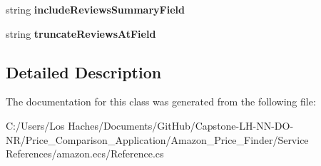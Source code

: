 \begin{DoxyCompactItemize}
\item 
\hypertarget{class_price___comparison_1_1amazon_1_1ecs_1_1_item_search_request_a0349f9c42f546fb07798253b7558176c}{string {\bfseries include\-Reviews\-Summary\-Field}}\label{class_price___comparison_1_1amazon_1_1ecs_1_1_item_search_request_a0349f9c42f546fb07798253b7558176c}

\item 
\hypertarget{class_price___comparison_1_1amazon_1_1ecs_1_1_item_search_request_a3098b8e26374ce2906429c21a3ea8f04}{string {\bfseries truncate\-Reviews\-At\-Field}}\label{class_price___comparison_1_1amazon_1_1ecs_1_1_item_search_request_a3098b8e26374ce2906429c21a3ea8f04}

\end{DoxyCompactItemize}


\subsection{Detailed Description}


The documentation for this class was generated from the following file\-:\begin{DoxyCompactItemize}
\item 
C\-:/\-Users/\-Los Haches/\-Documents/\-Git\-Hub/\-Capstone-\/\-L\-H-\/\-N\-N-\/\-D\-O-\/\-N\-R/\-Price\-\_\-\-Comparison\-\_\-\-Application/\-Amazon\-\_\-\-Price\-\_\-\-Finder/\-Service References/amazon.\-ecs/Reference.\-cs\end{DoxyCompactItemize}
